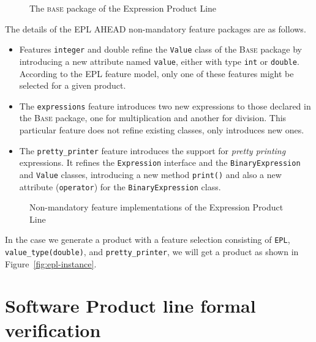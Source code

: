 \begin{figure}[htb]
\label{fig:epl-base}
\caption{The \textsc{base} package of the Expression Product Line}
\end{figure} 

The details of the EPL AHEAD non-mandatory feature packages are as follows. 

\begin{itemize}
\item Features \texttt{integer} and {double} refine the \texttt{Value} class of 
the \textsc{Base} package by introducing a new attribute named 
\texttt{value}, either with type \texttt{int} or \texttt{double}. According 
to the EPL feature model, only one of these features might be selected for 
a given product. 

\item The \texttt{expressions} feature introduces two new expressions 
to those declared in the \textsc{Base} package, one for multiplication 
and another for division. This particular feature does not refine 
existing classes, only introduces new ones. 

\item The \texttt{pretty\_printer} feature introduces the support for 
\emph{pretty printing} expressions. It refines the \texttt{Expression} 
interface and the \texttt{BinaryExpression} and \texttt{Value} classes, 
introducing a new method \texttt{print()} and also a 
new attribute (\texttt{operator}) for the \texttt{BinaryExpression} class.

\end{itemize}


\begin{figure}[htb]
\label{fig:epl-features}
\caption{Non-mandatory feature implementations of the Expression Product Line}
\end{figure} 

In the case we generate a product with  
a feature selection consisting of 
\texttt{EPL}, \texttt{value\_type(double)}, 
and \texttt{pretty\_printer}, we will get 
a product as shown in Figure~\ref{fig:epl-instance}. 


\section{Software Product line formal verification}